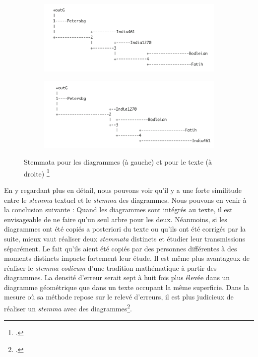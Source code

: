 \begin{figure}[h]
	\centering
	\begin{subfigure}{0.48\linewidth}
		\centering
		\includegraphics[width=\linewidth]{images/diagram_stemma.png}
	\end{subfigure}
	\hfill
	\begin{subfigure}{0.48\linewidth}
		\centering
		\includegraphics[width=\linewidth]{images/text_stemma.png}
	\end{subfigure}
	\caption{Stemmata pour les diagrammes (à gauche) et pour le texte (à droite) \footcite{raynaudBuildingStemmaCodicum2014}}
	\label{fig:stemma}
\end{figure}


En y regardant plus en détail, nous pouvons voir qu'il y a une forte similitude entre le \textit{stemma} textuel et le \textit{stemma} des diagrammes. Nous pouvons en venir à la conclusion suivante : Quand les diagrammes sont intégrés au texte, il est envisageable de ne faire qu'un seul arbre pour les deux. Néanmoins, si les diagrammes ont été copiés a posteriori du texte ou qu'ils ont été corrigés par la suite, mieux vaut réaliser deux \textit{stemmata} distincts et étudier leur transmissions séparément. Le fait qu'ils aient été copiés par des personnes différentes à des moments distincts impacte fortement leur étude. Il est même plus avantageux de réaliser le \textit{stemma codicum} d'une tradition mathématique à partir des diagrammes. La densité d'erreur serait sept à huit fois plus élevée dans un diagramme géométrique que dans un texte occupant la même superficie. Dans la mesure où sa méthode repose sur le relevé d'erreurs, il est plus judicieux de réaliser un \textit{stemma} avec des diagrammes\footcite{raynaudBuildingStemmaCodicum2014}.\\

